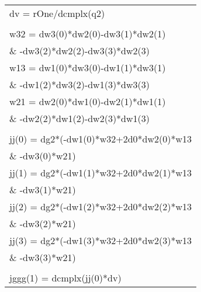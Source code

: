 \begin{center}
{\begin{supertabular}{l}
      \hspace{0.5em} dv = rOne/dcmplx(q2)\\
\\
      \hspace{0.5em} w32 = dw3(0)*dw2(0)-dw3(1)*dw2(1)\\
       \hspace{0.5em}\& \hspace{2em}-dw3(2)*dw2(2)-dw3(3)*dw2(3)\\
      \hspace{0.5em} w13 = dw1(0)*dw3(0)-dw1(1)*dw3(1)\\
       \hspace{0.5em}\& \hspace{2em}-dw1(2)*dw3(2)-dw1(3)*dw3(3)\\
      \hspace{0.5em} w21 = dw2(0)*dw1(0)-dw2(1)*dw1(1)\\
       \hspace{0.5em}\& \hspace{2em}-dw2(2)*dw1(2)-dw2(3)*dw1(3)\\
\\
      \hspace{0.5em} jj(0) = dg2*(-dw1(0)*w32+2d0*dw2(0)*w13\\
       \hspace{0.5em}\& \hspace{3em}-dw3(0)*w21)\\
      \hspace{0.5em} jj(1) = dg2*(-dw1(1)*w32+2d0*dw2(1)*w13\\
       \hspace{0.5em}\& \hspace{3em}-dw3(1)*w21)\\
      \hspace{0.5em} jj(2) = dg2*(-dw1(2)*w32+2d0*dw2(2)*w13\\
       \hspace{0.5em}\& \hspace{3em}-dw3(2)*w21)\\
      \hspace{0.5em} jj(3) = dg2*(-dw1(3)*w32+2d0*dw2(3)*w13\\
       \hspace{0.5em}\& \hspace{3em}-dw3(3)*w21)\\
\\
      \hspace{0.5em} jggg(1) = dcmplx(jj(0)*dv)\\

\end{supertabular}}
\end{center}
